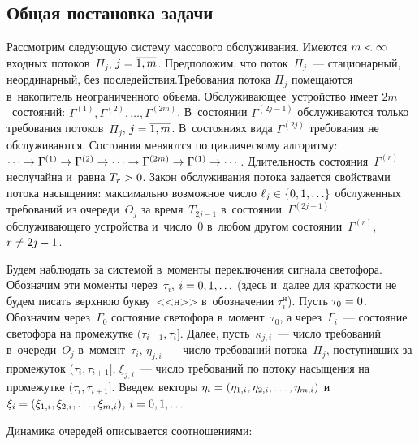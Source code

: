 \begin{multicols}{2}
\vspace*{-6pt}

\section{Общая постановка задачи}

\vspace*{-3pt}

Рассмотрим следующую систему массового обслуживания.  Имеются $m\hm<\infty$ входных
потоков~$\Pi_j$, $j\hm=\overline{1, m}$. Предположим, что поток~$\Pi_j$~--- ста\-ционарный, неординарный, без последействия.\linebreak  Требования потока
$\Pi_j$ помещаются в~накопитель неограниченного объема.  Обслуживающее~устройство имеет $2m$~состояний: 
$\Gamma^{(1)}, \Gamma^{(2)}, \ldots,
\Gamma^{(2m)}$. В~состоянии $\Gamma^{(2j-1)}$ обслуживаются только требования
потоков~$\Pi_j$, $j\hm=\overline{1, m}$. В~состояниях вида $\Gamma^{(2j)}$
требования не обслуживаются. Состояния меняются по циклическому алгоритму:
$\cdots\to\Gamma^{(1)}\hm\to \Gamma^{(2)} \to \cdots \to \Gamma^{(2m)}\hm\to
\Gamma^{(1)} \to \cdots$. Длительность состояния~$\Gamma^{(r)}$ неслучайна и~равна $T_r\hm>0$.  Закон обслуживания потока задается свойствами потока насыщения:
максимально возможное число $\ell_j\hm\in\{0, 1, \ldots\}$ обслуженных требований
из очереди~$O_j$ за время~$T_{2j-1}$ в~состоянии~$\Gamma^{(2j-1)}$
обслуживающего устройства и~число~0 в~любом другом состоянии~$\Gamma^{(r)}$,
$r\hm\neq 2j-1$.

Будем наблюдать за системой в~моменты переключения сигнала светофора. Обозначим
эти моменты через~$\tau_i$, $i\hm=0, 1, \ldots$ (здесь и~далее для краткости не
будем писать верхнюю букву~<<н>> в~обозначении $\tau^{\mathrm{н}}_i$). Пусть
$\tau_0\hm=0$. Обозначим через~$\Gamma_0$ состояние светофора в~момент~$\tau_0$, а
через~$\Gamma_i$~--- состояние светофора на промежутке $(\tau_{i-1}, \tau_i]$.
Далее, пусть~$\kappa_{j,i}$~--- число требований в~очереди~$O_j$ в~момент~$\tau_i$, 
$\eta_{j,i}$~--- число требований потока~$\Pi_j$, поступивших за
промежуток $(\tau_i, \tau_{i+1}]$, $\xi_{j,i}$~--- число требований по потоку
насыщения на промежутке $(\tau_i, \tau_{i+1}]$. Введем векторы
$\eta_i\hm=(\eta_{1,i}, \eta_{2,i}, \ldots, \eta_{m,i})$
и~$\xi_i\hm=(\xi_{1,i}, \xi_{2,i}, \ldots, \xi_{m,i})$, $i\hm=0, 1, \ldots$

Динамика очередей описывается соотноше\-ни\-ями:

\vspace*{-6pt}


\end{multicols}
